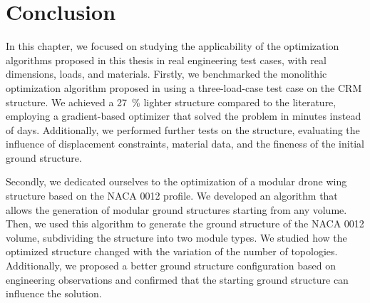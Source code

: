\section{Conclusion}
In this chapter, we focused on studying the applicability of the optimization algorithms proposed in this thesis in real engineering test cases, with real dimensions, loads, and materials. Firstly, we benchmarked the monolithic optimization algorithm proposed in  using a three-load-case test case on the CRM structure. We achieved a \qty{27}{\percent} lighter structure compared to the literature, employing a gradient-based optimizer that solved the problem in minutes instead of days. Additionally, we performed further tests on the structure, evaluating the influence of displacement constraints, material data, and the fineness of the initial ground structure.

Secondly, we dedicated ourselves to the optimization of a modular drone wing structure based on the NACA 0012 profile. We developed an algorithm that allows the generation of modular ground structures starting from any volume. Then, we used this algorithm to generate the ground structure of the NACA 0012 volume, subdividing the structure into two module types. We studied how the optimized structure changed with the variation of the number of topologies. Additionally, we proposed a better ground structure configuration based on engineering observations and confirmed that the starting ground structure can influence the solution.